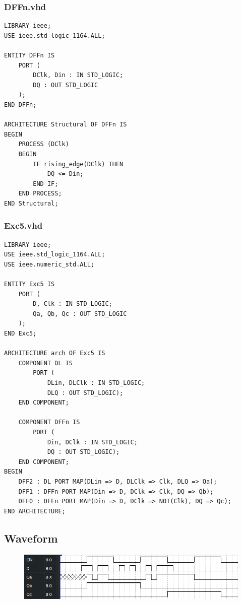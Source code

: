 \documentclass[13pt,a4paper]{report}
\begin{document}
\subsubsection{DFFn.vhd}
\begin{verbatim}
LIBRARY ieee;
USE ieee.std_logic_1164.ALL;

ENTITY DFFn IS
	PORT (
		DClk, Din : IN STD_LOGIC;
		DQ : OUT STD_LOGIC
	);
END DFFn;

ARCHITECTURE Structural OF DFFn IS
BEGIN
	PROCESS (DClk)
	BEGIN
		IF rising_edge(DClk) THEN
			DQ <= Din;
		END IF;
	END PROCESS;
END Structural;
\end{verbatim}

\subsubsection{Exc5.vhd}
\begin{verbatim}
LIBRARY ieee;
USE ieee.std_logic_1164.ALL;
USE ieee.numeric_std.ALL;

ENTITY Exc5 IS
	PORT (
		D, Clk : IN STD_LOGIC;
		Qa, Qb, Qc : OUT STD_LOGIC
	);
END Exc5;

ARCHITECTURE arch OF Exc5 IS
	COMPONENT DL IS
		PORT (
			DLin, DLClk : IN STD_LOGIC;
			DLQ : OUT STD_LOGIC);
	END COMPONENT;

	COMPONENT DFFn IS
		PORT (
			Din, DClk : IN STD_LOGIC;
			DQ : OUT STD_LOGIC);
	END COMPONENT;
BEGIN
	DFF2 : DL PORT MAP(DLin => D, DLClk => Clk, DLQ => Qa);
	DFF1 : DFFn PORT MAP(Din => D, DClk => Clk, DQ => Qb);
	DFF0 : DFFn PORT MAP(Din => D, DClk => NOT(Clk), DQ => Qc);
END ARCHITECTURE;
\end{verbatim}

\subsection{Waveform}
\begin{figure}[H]
\centering
\includegraphics[scale=0.8]{images/Exc5_waveform.png}
\end{figure}
\end{document}
